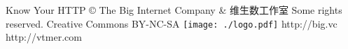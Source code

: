 \usepackage{cclicenses}

\beamertemplatenavigationsymbolsempty

{%
\begin{beamercolorbox}{}
    \hspace{25pt} \normalsize Know Your HTTP  \copyright \hspace{0in} The Big Internet Company \& 维生数工作室  Some rights reserved.
    \cc \hspace{-0.1in} Creative Commons BY-NC-SA
    \hfill
    \Huge \texttt{[image: ./logo.pdf]} \normalsize
    \hspace{5pt}http://big.vc
    \hfill
    \hspace{5pt}http://vtmer.com
    \vspace{8pt}
\end{beamercolorbox}%
}
